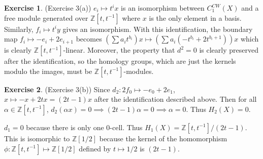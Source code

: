 \documentclass[12pt, psamsfonts]{amsart}
\theoremstyle{definition}
\newtheorem*{exer}{Exercise}
\theoremstyle{remark}
\numberwithin{equation}{section}
\begin{document}
\begin{exer}{(Exercise 3(a))}
  $e_i \mapsto t^ix$ is an isomorphism between $C_1^{CW}(X)$ and a free module generated over $\mathbb{Z}[t, t^{-1}]$ where $x$ is the only element in a basis.
  Similarly, $f_i \mapsto t^iy$ gives an isomorphism.
  With this identification, the boundary map $f_i \mapsto -e_i + 2e_{i + 1}$ becomes $(\sum a_it^{b_i}) x \mapsto (\sum a_i(-t^{b_i} + 2t^{b_i + 1}))x$ which is clearly $\mathbb{Z}[t, t^{-1}]$-linear.
  Moreover, the property that $d^2 = 0$ is clearly preserved after the identification, so the homology groups, which are just the kernels modulo the images, must be $\mathbb{Z}[t, t^{-1}]$-modules.
\end{exer}

\begin{exer}{(Exercise 3(b))}
  Since $d_2: 2f_0 \mapsto -e_0 + 2e_1$, $x \mapsto -x + 2tx = (2t - 1)x$ after the identification described above.
  Then for all $\alpha \in \mathbb{Z}[t, t^{-1}]$, $d_2(\alpha x) = 0 \implies (2t - 1)\alpha = 0 \implies \alpha = 0$.
  Thus $H_2(X) = 0$.

  $d_1 = 0$ because there is only one 0-cell.
  Thus $H_1(X) = \mathbb{Z}[t, t^{-1}] / (2t - 1)$.
  This is isomorphic to $\mathbb{Z}[1/2]$ because the kernel of the homomorphism $\phi: \mathbb{Z}[t, t^{-1}] \mapsto \mathbb{Z}[1/2]$ defined by $t \mapsto 1/2$ is $(2t - 1)$.
\end{exer}
\end{document}
